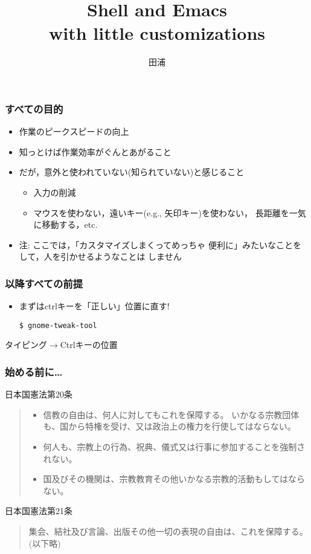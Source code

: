 \documentclass[12pt,dvipdfmx]{beamer}
\title{Shell and Emacs \\
with little customizations }
\institute{}
\author{田浦}
\date{}
\newcommand{\aka}[1]{{\color{red}#1}}
\begin{document}
\maketitle

\begin{frame}
\frametitle{すべての目的}
\begin{itemize}
\item 作業のピークスピードの向上

\item 知っとけば作業効率がぐんとあがること

\item だが，意外と使われていない(知られていない)と感じること

  \begin{itemize}
  \item 入力の削減
  \item マウスを使わない，遠いキー(e.g., 矢印キー)を使わない，
    長距離を一気に移動する，etc.
  \end{itemize}

\item 注: ここでは，「カスタマイズしまくってめっちゃ
  便利に」みたいなことをして，人を引かせるようなことは
  \aka{しません}

\end{itemize}
\end{frame}

\begin{frame}[fragile]
\frametitle{以降すべての前提}

\begin{itemize}
\item まずはctrlキーを「正しい」位置に直す!
\begin{lstlisting}
$ gnome-tweak-tool    
\end{lstlisting}%
\end{itemize}
タイピング$\rightarrow$Ctrlキーの位置
\end{frame}


\begin{frame}
\frametitle{始める前に\ldots}
日本国憲法第20条

\begin{quote}
\begin{itemize}
\item \aka{信教の自由は、何人に対してもこれを保障する。}
いかなる宗教団体も、国から特権を受け、又は政治上の権力を行使してはならない。
\item 何人も、宗教上の行為、祝典、儀式又は行事に参加することを強制されない。
\item 
\aka{国及びその機関は、宗教教育その他いかなる宗教的活動もしてはならない。}
\end{itemize}
\end{quote}

日本国憲法第21条

\begin{quote}
集会、結社及び言論、出版その他一切の表現の自由は、これを保障する。
(以下略)
\end{quote}

\end{frame}
      
\end{document}
